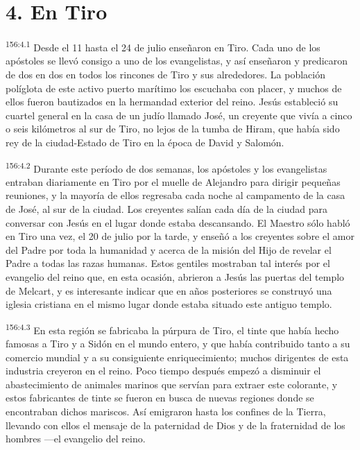 \section*{4. En Tiro}
\par
\textsuperscript{156:4.1} Desde el 11 hasta el 24 de julio enseñaron en Tiro. Cada uno de los apóstoles se llevó consigo a uno de los evangelistas, y así enseñaron y predicaron de dos en dos en todos los rincones de Tiro y sus alrededores. La población políglota de este activo puerto marítimo los escuchaba con placer, y muchos de ellos fueron bautizados en la hermandad exterior del reino. Jesús estableció su cuartel general en la casa de un judío llamado José, un creyente que vivía a cinco o seis kilómetros al sur de Tiro, no lejos de la tumba de Hiram, que había sido rey de la ciudad-Estado de Tiro en la época de David y Salomón.

\par
\textsuperscript{156:4.2} Durante este período de dos semanas, los apóstoles y los evangelistas entraban diariamente en Tiro por el muelle de Alejandro para dirigir pequeñas reuniones, y la mayoría de ellos regresaba cada noche al campamento de la casa de José, al sur de la ciudad. Los creyentes salían cada día de la ciudad para conversar con Jesús en el lugar donde estaba descansando. El Maestro sólo habló en Tiro una vez, el 20 de julio por la tarde, y enseñó a los creyentes sobre el amor del Padre por toda la humanidad y acerca de la misión del Hijo de revelar el Padre a todas las razas humanas. Estos gentiles mostraban tal interés por el evangelio del reino que, en esta ocasión, abrieron a Jesús las puertas del templo de Melcart, y es interesante indicar que en años posteriores se construyó una iglesia cristiana en el mismo lugar donde estaba situado este antiguo templo.

\par
\textsuperscript{156:4.3} En esta región se fabricaba la púrpura de Tiro, el tinte que había hecho famosas a Tiro y a Sidón en el mundo entero, y que había contribuido tanto a su comercio mundial y a su consiguiente enriquecimiento; muchos dirigentes de esta industria creyeron en el reino. Poco tiempo después empezó a disminuir el abastecimiento de animales marinos que servían para extraer este colorante, y estos fabricantes de tinte se fueron en busca de nuevas regiones donde se encontraban dichos mariscos. Así emigraron hasta los confines de la Tierra, llevando con ellos el mensaje de la paternidad de Dios y de la fraternidad de los hombres ---el evangelio del reino.

